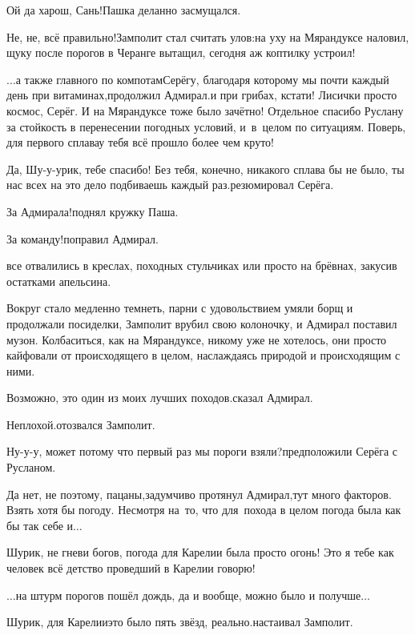 \diagdash Ой да харош, Сань!\mdash Пашка деланно засмущался.

\diagdash Не, не, всё правильно!\mdash Замполит стал считать улов:\mdash на уху на Мярандуксе наловил, щуку после порогов в Черанге вытащил, сегодня аж коптилку устроил!

\diagdash $\ldots$а также главного по компотам\mdash Серёгу, благодаря которому мы почти каждый день при витаминах,\mdash продолжил Адмирал.\mdash и при грибах, кстати! Лисички просто космос, Серёг. И на Мярандуксе тоже было зачётно! Отдельное спасибо Руслану за стойкость в перенесении погодных условий, и~в~целом по ситуациям. Поверь, для первого сплава\mdash у тебя всё прошло более чем круто! 

\diagdash Да, Шу-у-урик, тебе спасибо! Без тебя, конечно, никакого сплава бы не было, ты нас всех на это дело подбиваешь каждый раз.\mdash резюмировал Серёга.

\diagdash За Адмирала!\mdash поднял кружку Паша.

\diagdash За команду!\mdash поправил Адмирал.

\mdash все отвалились в креслах, походных стульчиках или просто на брёвнах, закусив остатками апельсина.

Вокруг стало медленно темнеть, парни с удовольствием умяли борщ и продолжали посиделки, Замполит врубил свою колоночку, и Адмирал поставил музон. Колбаситься, как на Мярандуксе, никому уже не хотелось, они просто кайфовали от происходящего в целом, наслаждаясь природой и происходящим с ними.

\diagdash Возможно, это один из моих лучших походов.\mdash сказал Адмирал.

\diagdash Неплохой.\mdash отозвался Замполит.

\diagdash Ну-у-у, может потому что первый раз мы пороги взяли?\mdash предположили Серёга с Русланом.

\diagdash Да нет, не поэтому, пацаны,\mdash задумчиво протянул Адмирал,\mdash тут много факторов. Взять хотя бы погоду. Несмотря на~то, что для~похода в целом погода была как бы так себе и$\ldots$

\diagdash Шурик, не гневи богов, погода для Карелии была просто огонь! Это я тебе как человек всё детство проведший в Карелии говорю!

\diagdash $\ldots$на штурм порогов пошёл дождь, да и вообще, можно было и получше$\ldots$

\diagdash Шурик, для Карелии\mdash это было пять звёзд, реально.\mdash настаивал Замполит.

